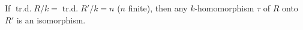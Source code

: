 If $\operatorname{tr.d.} R/k = \operatorname{tr.d.} R'/k = n$ ($n$ finite), then any $k$-homomorphism $\tau$ of $R$ onto $R'$ is an isomorphism.

